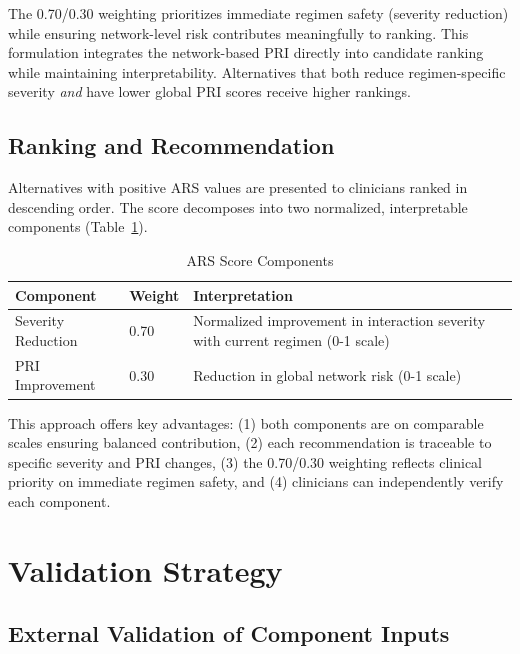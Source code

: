 \documentclass[11pt,a4paper]{article}
\begin{document}
The 0.70/0.30 weighting prioritizes immediate regimen safety (severity reduction) while ensuring network-level risk contributes meaningfully to ranking. This formulation integrates the network-based PRI directly into candidate ranking while maintaining interpretability. Alternatives that both reduce regimen-specific severity \textit{and} have lower global PRI scores receive higher rankings.

\subsection{Ranking and Recommendation}

Alternatives with positive ARS values are presented to clinicians ranked in descending order. The score decomposes into two normalized, interpretable components (Table~\ref{tab:ars_interpretation}).

\begin{table}[H]
\centering
\caption{ARS Score Components}
\label{tab:ars_interpretation}
\begin{tabular}{llp{7cm}}
\toprule
\textbf{Component} & \textbf{Weight} & \textbf{Interpretation} \\
\midrule
Severity Reduction & 0.70 & Normalized improvement in interaction severity with current regimen (0-1 scale) \\
PRI Improvement & 0.30 & Reduction in global network risk (0-1 scale) \\
\bottomrule
\end{tabular}
\end{table}

This approach offers key advantages: (1) both components are on comparable scales ensuring balanced contribution, (2) each recommendation is traceable to specific severity and PRI changes, (3) the 0.70/0.30 weighting reflects clinical priority on immediate regimen safety, and (4) clinicians can independently verify each component.

\section{Validation Strategy}

\subsection{External Validation of Component Inputs}
\end{document}
